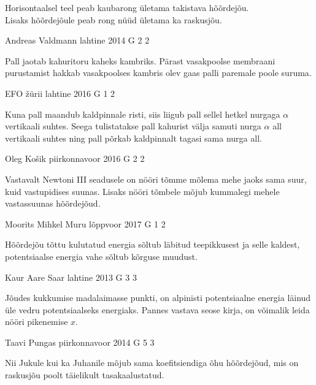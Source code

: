 \documentclass[11pt]{article}
\begin{document}
{{\ifHint
\osa Horisontaalsel teel peab kaubarong ületama takistava hõõrdejõu.\\
\osa Lisaks hõõrdejõule peab rong nüüd ületama ka raskusjõu.
\fi
}

{Andreas Valdmann} %
{lahtine} %
{2014} %
{G 2} %
{2} %
{

\ifHint
Pall jaotab kahuritoru kaheks kambriks. Pärast vasakpoolse membraani purustamist hakkab vasakpoolses kambris olev gaas palli paremale poole suruma.
\fi
}

{EFO žürii} %
{lahtine} %
{2016} %
{G 1} %
{2} %
{

\ifHint
Kuna pall maandub kaldpinnale risti, siis liigub pall sellel hetkel nurgaga $\alpha$ vertikaali suhtes. Seega tulistatakse pall kahurist välja samuti nurga $\alpha$ all vertikaali suhtes ning pall põrkab kaldpinnalt tagasi sama nurga all.
\fi
}

{Oleg Košik} %
{piirkonnavoor} %
{2016} %
{G 2} %
{2} %
{

\ifHint
Vastavalt Newtoni III seadusele on nööri tõmme mõlema mehe jaoks sama suur, kuid vastupidises suunas. Lisaks nööri tõmbele mõjub kummalegi mehele vastassuunas hõõrdejõud.
\fi
}

{Moorits Mihkel Muru} %
{lõppvoor} %
{2017} %
{G 1} %
{2} %
{

\ifHint
Hõõrdejõu tõttu kulutatud energia sõltub läbitud teepikkusest ja selle kaldest, potentsiaalse energia vahe sõltub kõrguse muudust.
\fi
}

{Kaur Aare Saar} %
{lahtine} %
{2013} %
{G 3} %
{3} %
{

\ifHint
Jõudes kukkumise madalaimasse punkti, on alpinisti potentsiaalne energia läinud üle vedru potentsiaalseks energiaks. Pannes vastava seose kirja, on võimalik leida nööri pikenemise $x$.
\fi
}

{Taavi Pungas} %
{piirkonnavoor} %
{2014} %
{G 5} %
{3} %
{

\ifHint
Nii Jukule kui ka Juhanile mõjub sama koefitsiendiga õhu hõõrdejõud, mis on raskusjõu poolt täielikult tasakaalustatud.
\fi
}

}
\end{document}
